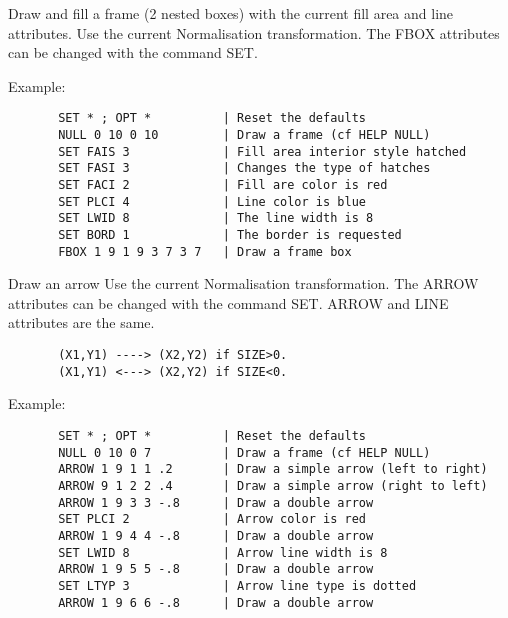    \par
Draw and fill a frame (2 nested boxes) with the current fill area and line 
   attributes.  Use the current Normalisation transformation.  The FBOX 
   attributes can be changed with the command SET.  

   \par
Example:  
\begin{verbatim}
       SET * ; OPT *          | Reset the defaults
       NULL 0 10 0 10         | Draw a frame (cf HELP NULL)
       SET FAIS 3             | Fill area interior style hatched
       SET FASI 3             | Changes the type of hatches
       SET FACI 2             | Fill are color is red
       SET PLCI 4             | Line color is blue
       SET LWID 8             | The line width is 8
       SET BORD 1             | The border is requested
       FBOX 1 9 1 9 3 7 3 7   | Draw a frame box
\end{verbatim}

\ENDCMD


\BEGARG
{}
\ENDARG

   \par
Draw an arrow Use the current Normalisation transformation.  The ARROW 
   attributes can be changed with the command SET.  ARROW and LINE attributes 
   are the same.  

\begin{verbatim}
       (X1,Y1) ----> (X2,Y2) if SIZE>0.
       (X1,Y1) <---> (X2,Y2) if SIZE<0.
\end{verbatim}
\ENDVERB
   \par
Example:  
\begin{verbatim}
       SET * ; OPT *          | Reset the defaults
       NULL 0 10 0 7          | Draw a frame (cf HELP NULL)
       ARROW 1 9 1 1 .2       | Draw a simple arrow (left to right)
       ARROW 9 1 2 2 .4       | Draw a simple arrow (right to left)
       ARROW 1 9 3 3 -.8      | Draw a double arrow
       SET PLCI 2             | Arrow color is red
       ARROW 1 9 4 4 -.8      | Draw a double arrow
       SET LWID 8             | Arrow line width is 8
       ARROW 1 9 5 5 -.8      | Draw a double arrow
       SET LTYP 3             | Arrow line type is dotted
       ARROW 1 9 6 6 -.8      | Draw a double arrow
\end{verbatim}

